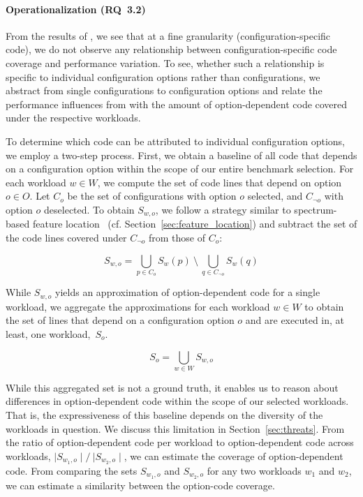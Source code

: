 \paragraph*{Operationalization (RQ~3.2)}
From the results of , we see that at a fine granularity  (configuration-specific code), we do not observe any relationship between configuration-specific code coverage and performance variation. To see, whether such a relationship is specific to individual configuration options rather than configurations, we abstract from single configurations to configuration options and relate the performance influences from  with the amount of option-dependent code covered under the respective workloads.

To determine which code can be attributed to individual configuration options, we employ a two-step process. First, we obtain a baseline of all code that depends on a configuration option within the scope of our entire benchmark selection. For each workload $w \in W$, we compute the set of code lines that depend on option $o \in O$. Let $C_{o}$ be the set of configurations with option $o$ selected, and $C_{\neg o}$ with option $o$ deselected. To obtain $S_{w, o}$, we follow a strategy similar to spectrum-based feature location~\cite{michelon_spectrum_2021} (cf. Section~\ref{sec:feature_location}) and subtract the set of the code lines covered under $C_{\neg o}$ from those of $C_{o}$:

\begin{equation}
	S_{w, o} = \bigcup_{p \in C_{o}} S_{w}(p) ~ \setminus ~ \bigcup_{q \in C_{\neg o}} S_{w}(q)
\end{equation}

While $S_{w, o}$ yields an approximation of option-dependent code for a single workload, we aggregate the approximations for each workload $w \in W$ to obtain the set of lines that depend on a configuration option $o$ and are executed in, at least, one workload,~$S_{o}$. 

\begin{equation}
	S_{o} = \bigcup_{w \in W} S_{w, o}
\end{equation}

While this aggregated set is not a ground truth, it enables us to reason about differences in option-dependent code within the scope of our selected workloads. That is, the expressiveness of this baseline depends on the diversity of the workloads in question. We discuss this limitation in Section~\ref{sec:threats}. From the ratio of option-dependent code per workload to option-dependent code across workloads, $\mid S_{w_1, o}\mid/~{\mid S_{w_2, o}\mid}$, we can estimate the coverage of option-dependent code. From comparing the sets $S_{w_1, o}$ and $S_{w_2, o}$ for any two workloads $w_1$ and $w_2$, we can estimate a similarity between the option-code coverage.

